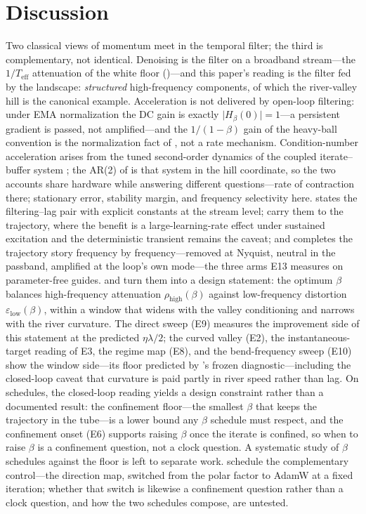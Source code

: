 \documentclass[11pt,a4paper]{article}
\theoremstyle{remark}
\newcommand{\Hmag}[1]{\lvert H_\beta(#1)\rvert}
\newcommand{\Teff}{T_{\mathrm{eff}}}
\newcommand{\rhohigh}{\rho_{\mathrm{high}}}
\newcommand{\epslow}{\varepsilon_{\mathrm{low}}}
\begin{document}
\section{Discussion}
\label{sec:discussion}

Two classical views of momentum meet in the temporal filter; the third is complementary, not identical.
Denoising is the filter on a broadband stream---the $1/\Teff$ attenuation of the white floor ()---and this paper's reading is the filter fed by the landscape: \emph{structured} high-frequency components, of which the river-valley hill is the canonical example.
Acceleration is not delivered by open-loop filtering: under EMA normalization the DC gain is exactly $\Hmag{0}=1$---a persistent gradient is passed, not amplified---and the $1/(1-\beta)$ gain of the heavy-ball convention is the normalization fact of , not a rate mechanism.
Condition-number acceleration arises from the tuned second-order dynamics of the coupled iterate--buffer system \citep{polyak1964momentum,sutskever2013momentum,lessard2016analysis}; the AR(2) of  is that system in the hill coordinate, so the two accounts share hardware while answering different questions---rate of contraction there; stationary error, stability margin, and frequency selectivity here.
 states the filtering--lag pair with explicit constants at the stream level;  carry them to the trajectory, where the benefit is a large-learning-rate effect under sustained excitation and the deterministic transient remains the caveat; and  completes the trajectory story frequency by frequency---removed at Nyquist, neutral in the passband, amplified at the loop's own mode---the three arms E13 measures on parameter-free guides.
 and  turn them into a design statement: the optimum $\beta$ balances high-frequency attenuation $\rhohigh(\beta)$ against low-frequency distortion $\epslow(\beta)$, within a window that widens with the valley conditioning and narrows with the river curvature.
The direct sweep (E9) measures the improvement side of this statement at the predicted $\eta\lambda/2$; the curved valley (E2), the instantaneous-target reading of E3, the regime map (E8), and the bend-frequency sweep (E10) show the window side---its floor predicted by 's frozen diagnostic---including the closed-loop caveat that curvature is paid partly in river speed rather than lag.
On schedules, the closed-loop reading yields a design constraint rather than a documented result: the confinement floor---the smallest $\beta$ that keeps the trajectory in the tube---is a lower bound any $\beta$ schedule must respect, and the confinement onset (E6) supports raising $\beta$ once the iterate is confined, so when to raise $\beta$ is a confinement question, not a clock question.
A systematic study of $\beta$ schedules against the floor is left to separate work.
\citet{shen2026muon} schedule the complementary control---the direction map, switched from the polar factor to AdamW at a fixed iteration; whether that switch is likewise a confinement question rather than a clock question, and how the two schedules compose, are untested.
\end{document}
